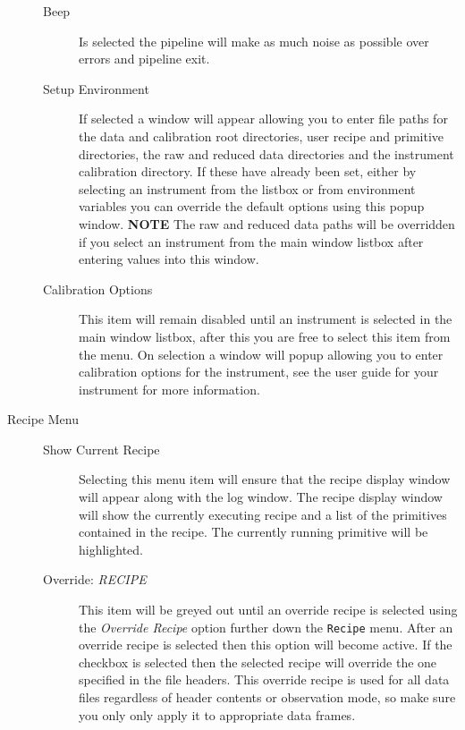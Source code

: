 \documentclass[twoside,11pt]{article}
\renewcommand{\_}{\texttt{\symbol{95}}}
\begin{document}
\begin{description}
\begin{description}
\item[{Beep}] \mbox{}

Is selected the pipeline will make as much noise as possible over
errors and pipeline exit.


\item[{Setup Environment}] \mbox{}

If selected a window will appear allowing you to enter file paths for
the data and calibration root directories, user recipe and primitive
directories, the raw and reduced data directories and the instrument
calibration directory. If these have already been set, either by
selecting an instrument from the listbox or from environment variables
you can override the default options using this popup window. \textbf{NOTE}
The raw and reduced data paths will be overridden if you select an
instrument from the main window listbox after entering values into
this window.


\item[{Calibration Options}] \mbox{}

This item will remain disabled until an instrument is selected in the
main window listbox, after this you are free to select this item from
the menu. On selection a window will popup allowing you to enter
calibration options for the instrument, see the user guide for your
instrument for more information.

\end{description}

\item[{Recipe Menu}] \mbox{}\begin{description}

\item[{Show Current Recipe}] \mbox{}

Selecting this menu item will ensure that the recipe display window
will appear along with the log window. The recipe display window will
show the currently executing recipe and a list of the primitives
contained in the recipe. The currently running primitive will be
highlighted.


\item[{Override: \textit{RECIPE}}] \mbox{}

This item will be greyed out until an override recipe is selected
using the \textit{Override Recipe} option further down the \texttt{Recipe}
menu. After an override recipe is selected then this option will
become active. If the checkbox is selected then the selected recipe
will override the one specified in the file headers. This override
recipe is used for all data files regardless of header contents or
observation mode, so make sure you only only apply it to appropriate
data frames.



\end{description}
\end{description}
\end{document}
